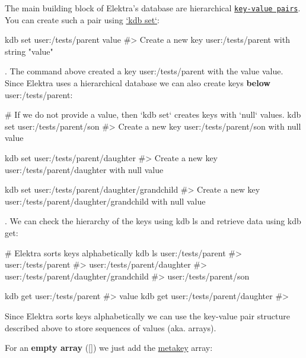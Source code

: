 The main building block of Elektra’s database are hierarchical \href{https://en.wikipedia.org/wiki/Key-value_database}{\tt key-\/value pairs}. You can create such a pair using \hyperlink{doc_help_kdb-set_md}{`kdb set`}\+:


\begin{DoxyCode}
kdb set user:/tests/parent value
#> Create a new key user:/tests/parent with string "value"
\end{DoxyCode}


. The command above created a key {\ttfamily user\+:/tests/parent} with the value {\ttfamily value}. Since Elektra uses a hierarchical database we can also create keys {\bfseries below} {\ttfamily user\+:/tests/parent}\+:


\begin{DoxyCode}
# If we do not provide a value, then `kdb set` creates keys with `null` values.
kdb set user:/tests/parent/son
#> Create a new key user:/tests/parent/son with null value

kdb set user:/tests/parent/daughter
#> Create a new key user:/tests/parent/daughter with null value

kdb set user:/tests/parent/daughter/grandchild
#> Create a new key user:/tests/parent/daughter/grandchild with null value
\end{DoxyCode}


. We can check the hierarchy of the keys using {\ttfamily kdb ls} and retrieve data using {\ttfamily kdb get}\+:


\begin{DoxyCode}
# Elektra sorts keys alphabetically
kdb ls user:/tests/parent
#> user:/tests/parent
#> user:/tests/parent/daughter
#> user:/tests/parent/daughter/grandchild
#> user:/tests/parent/son

kdb get user:/tests/parent
#> value
kdb get user:/tests/parent/daughter
#>
\end{DoxyCode}


Since Elektra sorts keys alphabetically we can use the key-\/value pair structure described above to store sequences of values (aka. arrays).

For an {\bfseries empty array} ({\ttfamily \mbox{[}\mbox{]}}) we just add the \hyperlink{doc_help_elektra-metadata_md}{metakey} {\ttfamily array}\+:

